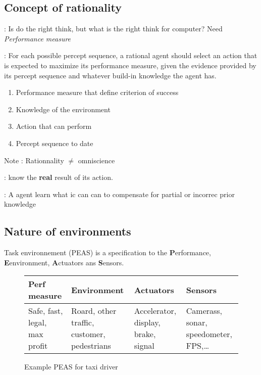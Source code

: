 \subsection{Concept of rationality}
\begin{description}

    \item[Rationality] : Is do the right think, but what is the
        right think for computer? Need \textit{Performance measure}

    \item[Rationnal  agent]  : For  each  possible  percept sequence,  a
    rational agent should select an  action that is expected to maximize
    its performance measure, given the  evidence provided by its percept
    sequence and whatever build-in knowledge the agent has.

        \begin{enumerate}
            \item Performance measure that define criterion of success
            \item Knowledge of the environment
            \item Action that can perform
            \item Percept sequence to date
        \end{enumerate}

    \item Note : Rationnality $\neq$ omniscience

    \item[Omniscience agent] : know the \textbf{real} result of its action.

    \item[Autonomy] :  A agent learn what  ic can can to  compensate for
    partial or incorrec prior knowledge

\end{description}


\subsection{Nature of environments}
Task environnement (PEAS) is a specification to the \textbf{P}erformance, 
\textbf{E}environment, \textbf{A}ctuators ans \textbf{S}ensors.

\begin{figure}[h]
    \centering
    \begin{tabular}{|m{3cm}|m{3cm}|m{3cm}|m{3cm}|}
        \hline
        Perf measure & Environment & Actuators & Sensors \\
        \hline
        Safe, fast, legal, max profit  & Roard, other traffic, customer,
        pedestrians &  Accelerator, display,  brake, signal  & Camerass,
        sonar, speedometer, FPS,\ldots \\
        \hline

    \end{tabular}
    \caption{Example PEAS for taxi driver}
\end{figure}

